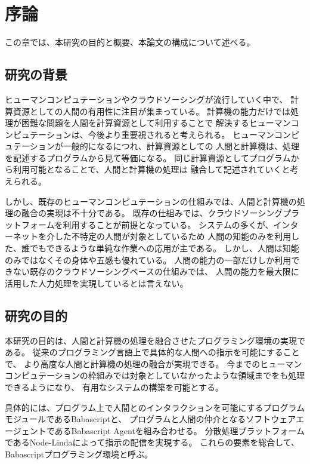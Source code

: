 \chapter{序論}\label{chap:introduction}

この章では、本研究の目的と概要、本論文の構成について述べる。

\section{研究の背景}\label{ux7814ux7a76ux306eux80ccux666f}

ヒューマンコンピュテーションやクラウドソーシングが流行していく中で、
計算資源としての人間の有用性に注目が集まっている。
計算機の能力だけでは処理が困難な問題を人間を計算資源として利用することで
解決するヒューマンコンピュテーションは、今後より重要視されると考えられる。
ヒューマンコンピュテーションが一般的になるにつれ、計算資源としての
人間と計算機は、処理を記述するプログラムから見て等価になる。
同じ計算資源としてプログラムから利用可能となることで、人間と計算機の処理は
融合して記述されていくと考えられる。

しかし、既存のヒューマンコンピュテーションの仕組みでは、人間と計算機の処理の融合の実現は不十分である。
既存の仕組みでは、クラウドソーシングプラットフォームを利用することが前提となっている。
システムの多くが、インターネットを介した不特定の人間が対象としているため
人間の知能のみを利用した、誰でもできるような単純な作業への応用が主である。
しかし、人間は知能のみではなくその身体や五感も優れている。
人間の能力の一部だけしか利用できない既存のクラウドソーシングベースの仕組みでは、
人間の能力を最大限に活用した人力処理を実現しているとは言えない。

\section{研究の目的}\label{ux7814ux7a76ux306eux76eeux7684}

本研究の目的は、人間と計算機の処理を融合させたプログラミング環境の実現である。
従来のプログラミング言語上で具体的な人間への指示を可能にすることで、
より高度な人間と計算機の処理の融合が実現できる。
今までのヒューマンコンピュテーションの枠組みでは対象としていなかったような領域までをも処理できるようになり、
有用なシステムの構築を可能とする。

具体的には、プログラム上で人間とのインタラクションを可能にするプログラムモジュールであるBabascriptと、
プログラムと人間の仲介となるソフトウェアエージェントであるBabascript
Agentを組み合わせる。
分散処理プラットフォームであるNode-Lindaによって指示の配信を実現する。
これらの要素を総合して、Babascriptプログラミング環境と呼ぶ。

